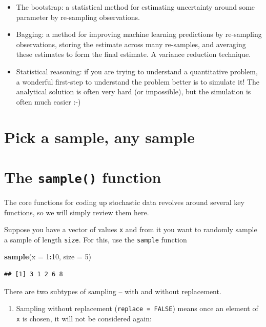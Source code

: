 \documentclass[]{book}
\newenvironment{Shaded}{\begin{snugshade}}{\end{snugshade}}
\newcommand{\KeywordTok}[1]{\textcolor[rgb]{0.13,0.29,0.53}{\textbf{#1}}}
\newcommand{\DataTypeTok}[1]{\textcolor[rgb]{0.13,0.29,0.53}{#1}}
\newcommand{\DecValTok}[1]{\textcolor[rgb]{0.00,0.00,0.81}{#1}}
\newcommand{\OperatorTok}[1]{\textcolor[rgb]{0.81,0.36,0.00}{\textbf{#1}}}
\newcommand{\NormalTok}[1]{#1}
\providecommand{\tightlist}{%
  \setlength{\itemsep}{0pt}\setlength{\parskip}{0pt}}
\theoremstyle{definition}
\theoremstyle{definition}
\theoremstyle{definition}
\theoremstyle{remark}
\begin{document}
\begin{itemize}
\tightlist
\item
  The bootstrap: a statistical method for estimating uncertainty around
  some parameter by re-sampling observations.
\item
  Bagging: a method for improving machine learning predictions by
  re-sampling observations, storing the estimate across many re-samples,
  and averaging these estimates to form the final estimate. A variance
  reduction technique.
\item
  Statistical reasoning: if you are trying to understand a quantitative
  problem, a wonderful first-step to understand the problem better is to
  simulate it! The analytical solution is often very hard (or
  impossible), but the simulation is often much easier :-)
\end{itemize}

\section{Pick a sample, any sample}\label{pick-a-sample-any-sample}

\section{\texorpdfstring{The \texttt{sample()}
function}{The sample() function}}\label{the-sample-function}

The core functions for coding up stochastic data revolves around several
key functions, so we will simply review them here.

Suppose you have a vector of values \texttt{x} and from it you want to
randomly sample a sample of length \texttt{size}. For this, use the
\texttt{sample} function

\begin{Shaded}
\begin{Highlighting}[]
\KeywordTok{sample}\NormalTok{(}\DataTypeTok{x =} \DecValTok{1}\OperatorTok{:}\DecValTok{10}\NormalTok{, }\DataTypeTok{size =} \DecValTok{5}\NormalTok{)}
\end{Highlighting}
\end{Shaded}

\begin{verbatim}
## [1] 3 1 2 6 8
\end{verbatim}

There are two subtypes of sampling -- with and without replacement.

\begin{enumerate}
\def\labelenumi{\arabic{enumi}.}
\tightlist
\item
  Sampling without replacement (\texttt{replace\ =\ FALSE}) means once
  an element of \texttt{x} is chosen, it will not be considered again:
\end{enumerate}
\end{document}
